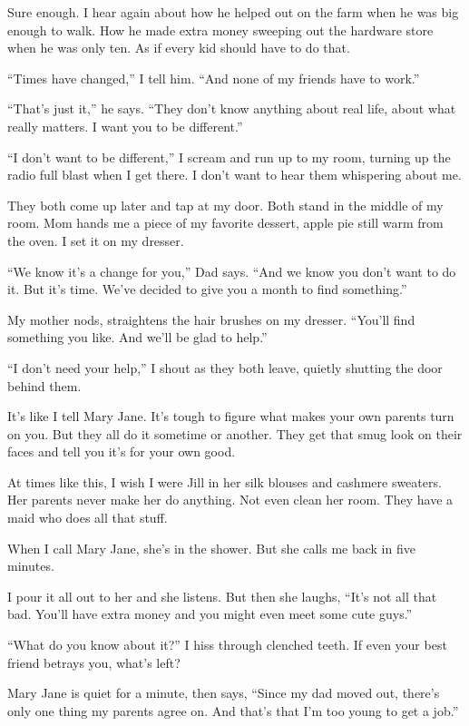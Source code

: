 \documentclass[twoside,10pt]{book}
\begin{document}
Sure enough. I hear again about how he helped out on the farm when he
was big enough to walk. How he made extra money sweeping out the
hardware store when he was only ten. As if every kid should have to do
that.

``Times have changed,'' I tell him. ``And none of my friends have to
work.''

``That's just it,'' he says. ``They don't know anything about real life,
about what really matters. I want you to be different.''

``I don't want to be different,'' I scream and run up to my room,
turning up the radio full blast when I get there. I don't want to hear
them whispering about me.

They both come up later and tap at my door. Both stand in the middle of
my room. Mom hands me a piece of my favorite dessert, apple pie still
warm from the oven. I set it on my dresser.

``We know it's a change for you,'' Dad says. ``And we know you don't
want to do it. But it's time. We've decided to give you a month to find
something.''

My mother nods, straightens the hair brushes on my dresser. ``You'll
find something you like. And we'll be glad to help.''

``I don't need your help,'' I shout as they both leave, quietly shutting
the door behind them.

It's like I tell Mary Jane. It's tough to figure what makes your own
parents turn on you. But they all do it sometime or another. They get
that smug look on their faces and tell you it's for your own good.

At times like this, I wish I were Jill in her silk blouses and cashmere
sweaters. Her parents never make her do anything. Not even clean her
room. They have a maid who does all that stuff.

When I call Mary Jane, she's in the shower. But she calls me back in
five minutes.

I pour it all out to her and she listens. But then she laughs, ``It's
not all that bad. You'll have extra money and you might even meet some
cute guys.''

``What do you know about it?'' I hiss through clenched teeth. If even
your best friend betrays you, what's left?

Mary Jane is quiet for a minute, then says, ``Since my dad moved out,
there's only one thing my parents agree on. And that's that I'm too
young to get a job.''
\end{document}

